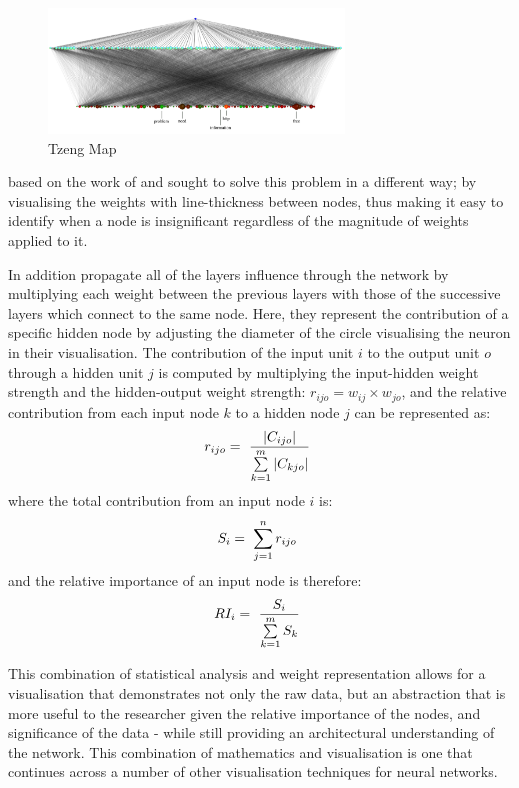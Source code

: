 \documentclass[a4paper,11pt,titlepage]{article}
\begin{document}
	\begin{figure}[H]
		\centering 
    		\includegraphics[width=0.7\textwidth]{img/tzeng_large_map.png} 
    		\caption{Tzeng Map}%
 	\end{figure}
 	
	\cite{Tzeng2005} based on the work of 	\cite{Garson1991} and \cite{Goh1995} sought to solve this problem in a different way; by visualising the weights with line-thickness between nodes, thus making it easy to identify when a node is insignificant regardless of the magnitude of weights applied to it.
	\par 
	In addition 	\cite{Tzeng2005} propagate all of the layers influence through the network by multiplying each weight between the previous layers with those of the successive layers which connect to the same node. Here, they represent the contribution of a specific hidden node by adjusting the diameter of the circle visualising the neuron in their visualisation. The contribution of the input unit $ i $ to the output unit $ o $ through a hidden unit $ j $ is computed by multiplying the input-hidden weight strength and the hidden-output weight strength:
$ r_{ijo} = w_{ij} \times w_{jo} $, and the relative contribution from each input node $ k $ to a hidden node $ j $ can be represented as:
		$$
		r_{ijo} = 
		\text{ $ \frac{|C_{ijo}|}{\sum\limits_{k=1}^m |C_{kjo}| } $ }
		$$ 
	where the total contribution from an input node $ i $ is: 
		$$
		S_{i} = 
		\text{ $ \sum\limits_{j=1}^n r_{ijo} $ }
		$$ 
	and the relative importance of an input node is therefore:
		$$
		RI_{i} = 
		\text{ $ \frac{S_{i}}{\sum\limits_{k=1}^m S_{k} } $ }
		$$ 
	 \par 
 		
	 This combination of statistical analysis and weight representation allows for a visualisation that demonstrates not only the raw data, but an abstraction that is more useful to the researcher given the relative importance of the nodes, and significance of the data - while still providing an architectural understanding of the network. This combination of mathematics and visualisation is one that continues across a number of other visualisation techniques for neural networks.
	 
\end{document}
